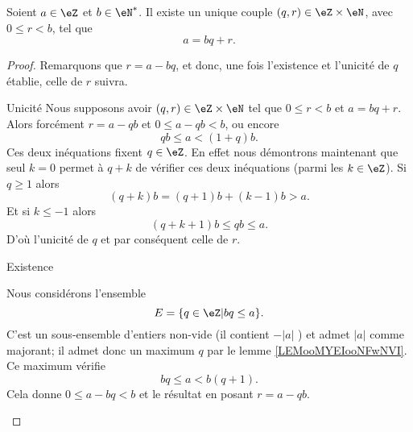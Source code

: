 \begin{theorem}     \label{ThoDivisEuclide}
    Soient \( a\in\eZ\) et \( b\in\eN^*\). Il existe un unique couple \( (q,r)\in\eZ\times\eN\), avec \( 0\leq r<b\), tel que
    \begin{equation}
        a=bq+r.
    \end{equation}
\end{theorem}

\begin{proof}
    Remarquons que \( r = a - bq \), et donc, une fois l'existence et l'unicité de $q$ établie, celle de $r$ suivra.

    \begin{subproof}
        \item[Unicité]
            Nous supposons avoir \( (q,r)\in \eZ\times \eN\) tel que \( 0\leq r<b\) et \( a=bq+r\). Alors forcément \( r=a-qb\) et $0\leq a-qb<b$, ou encore
            \begin{equation}
                qb\leq a<(1+q)b.
            \end{equation}
            Ces deux inéquations fixent \( q\in \eZ\). En effet nous démontrons maintenant que seul \( k=0\) permet à \( q+k\) de vérifier ces deux inéquations (parmi les \( k\in \eZ\)). Si \( q\geq 1\) alors
            \begin{equation}
                (q+k)b=(q+1)b+(k-1)b>a.
            \end{equation}
            Et si \( k\leq -1\) alors
            \begin{equation}
                (q+k+1)b\leq qb\leq a.
            \end{equation}
            D'où l'unicité de \( q\) et par conséquent celle de \( r\).

        \item[Existence]

            Nous considérons l'ensemble
    \begin{equation*}
        E = \{ q \in \eZ  | bq \leq a \}.
    \end{equation*}
    C'est un sous-ensemble d'entiers non-vide (il contient \( -|a| \) ) et admet \( |a| \) comme majorant; il admet donc un maximum $q$ par le lemme \ref{LEMooMYEIooNFwNVI}. Ce maximum vérifie
     \begin{equation}
         bq\leq a<b(q+1).
     \end{equation}
     Cela donne \( 0\leq a-bq<b\) et le résultat en posant \( r=a-qb\).
    \end{subproof}
\end{proof}

